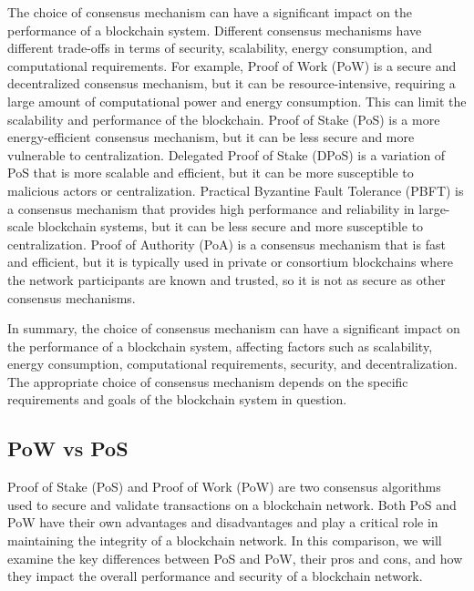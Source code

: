 \documentclass[target=mst,aauheader=]{thud}
\begin{document}
    The choice of consensus mechanism can have a significant impact on the performance of a blockchain system. Different consensus mechanisms have different trade-offs in terms of security, scalability, energy consumption, and computational requirements. For example, Proof of Work (PoW) is a secure and decentralized consensus mechanism, but it can be resource-intensive, requiring a large amount of computational power and energy consumption. This can limit the scalability and performance of the blockchain. Proof of Stake (PoS) is a more energy-efficient consensus mechanism, but it can be less secure and more vulnerable to centralization. Delegated Proof of Stake (DPoS) is a variation of PoS that is more scalable and efficient, but it can be more susceptible to malicious actors or centralization. Practical Byzantine Fault Tolerance (PBFT) is a consensus mechanism that provides high performance and reliability in large-scale blockchain systems, but it can be less secure and more susceptible to centralization. Proof of Authority (PoA) is a consensus mechanism that is fast and efficient, but it is typically used in private or consortium blockchains where the network participants are known and trusted, so it is not as secure as other consensus mechanisms.\par
    In summary, the choice of consensus mechanism can have a significant impact on the performance of a blockchain system, affecting factors such as scalability, energy consumption, computational requirements, security, and decentralization. The appropriate choice of consensus mechanism depends on the specific requirements and goals of the blockchain system in question.

    \subsection{PoW vs PoS}

    Proof of Stake (PoS) and Proof of Work (PoW) are two consensus algorithms used to secure and validate transactions on a blockchain network. Both PoS and PoW have their own advantages and disadvantages\cite{edChainPowvsPos} and play a critical role in maintaining the integrity of a blockchain network. In this comparison, we will examine the key differences between PoS and PoW, their pros and cons, and how they impact the overall performance and security of a blockchain network.\par
\end{document}
